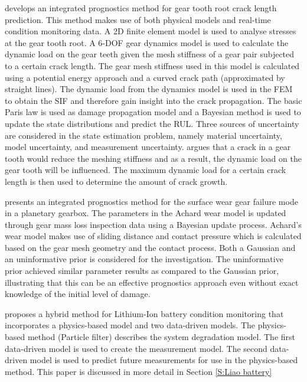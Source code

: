 \cite{Zhao2013} develops an integrated prognostics method for gear tooth root crack length prediction. This method makes use of both physical models and real-time condition monitoring data. A 2D finite element model is used to analyse stresses at the gear tooth root. A 6-DOF gear dynamics model is used to calculate the dynamic load on the gear teeth given the mesh stiffness of a gear pair subjected to a certain crack length. The gear mesh stiffness used in this model is calculated using a potential energy approach and a curved crack path (approximated by straight lines). The dynamic load from the dynamics model is used in the FEM to obtain the SIF and therefore gain insight into the crack propagation. The basic Paris law is used as damage propagation model and a Bayesian method is used to update the state distributions and predict the RUL. Three sources of uncertainty are considered in the state estimation problem, namely material uncertainty, model uncertainty, and measurement uncertainty. \cite{Zhao2013} argues that a crack in a gear tooth would reduce the meshing stiffness and as a result, the dynamic load on the gear tooth will be influenced. The maximum dynamic load for a certain crack length is then used to determine the amount of crack growth. 


\cite{Zhao2018a} presents an integrated prognostics method for the surface wear gear failure mode in a planetary gearbox. The parameters in the Achard wear model is updated through gear mass loss inspection data using a Bayesian update process. Achard's wear model makes use of sliding distance and contact pressure which is calculated based on the gear mesh geometry and the contact process. Both a Gaussian and an uninformative prior is considered for the investigation. The uninformative prior achieved similar parameter results as compared to the Gaussian prior, illustrating that this can be an effective prognostics approach even without exact knowledge of the initial level of damage. 




\cite{Liao2016} proposes a hybrid method for Lithium-Ion battery condition monitoring that incorporates a physics-based model and two data-driven models. The physics-based method (Particle filter) describes the system degradation model. The first data-driven model is used to create the measurement model. The second data-driven model is used to predict future measurements for use in the physics-based method. This paper is discussed in more detail in Section \ref{S:Liao battery}

